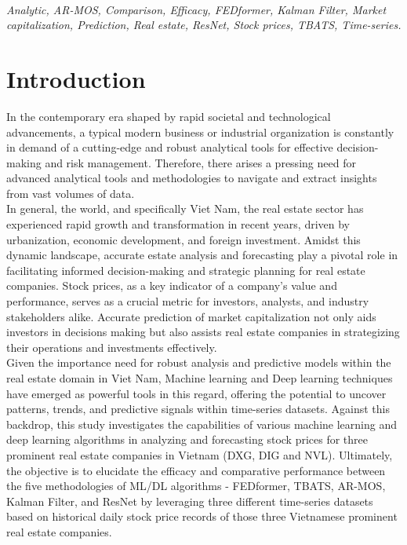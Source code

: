 \documentclass{ieeeojies}
\begin{document}
\begin{keywords}
\\
\textit{Analytic, AR-MOS, Comparison, Efficacy, 
FEDformer, Kalman Filter, Market capitalization,
Prediction, Real estate, ResNet, Stock prices, TBATS, Time-series.}
\end{keywords}

\titlepgskip=-15pt

\maketitle

\section{Introduction}
\label{sec:introduction}
In the contemporary era shaped by rapid societal and technological advancements, a typical modern business or industrial organization is constantly in demand of a cutting-edge and robust analytical tools for effective decision-making and risk management. Therefore, there arises a pressing need for advanced analytical tools and methodologies to navigate and extract insights from vast volumes of data.\\ 
In general, the world, and specifically Viet Nam, the real estate sector has experienced rapid growth and transformation in recent years, driven by urbanization, economic development, and foreign investment. Amidst this dynamic landscape, accurate estate analysis and forecasting play a pivotal role in facilitating informed decision-making and strategic planning for real estate companies. Stock prices, as a key indicator of a company's value and performance, serves as a crucial metric for investors, analysts, and industry stakeholders alike. Accurate prediction of market capitalization not only aids investors in decisions making but also assists real estate companies in strategizing their operations and investments effectively. \\
Given the importance need for robust analysis and predictive models within the real estate domain in Viet Nam, Machine learning and Deep learning techniques have emerged as powerful tools in this regard, offering the potential to uncover patterns, trends, and predictive signals within time-series datasets. Against this backdrop, this study investigates the capabilities of various machine learning and deep learning algorithms in analyzing and forecasting stock prices for three prominent real estate companies in Vietnam (DXG, DIG and NVL). Ultimately, the objective is to elucidate the efficacy and comparative performance between the five methodologies of ML/DL algorithms - FEDformer, TBATS, AR-MOS, Kalman Filter, and ResNet by leveraging three different time-series datasets based on historical daily stock price records of those three Vietnamese prominent real estate companies. \\
\end{document}
